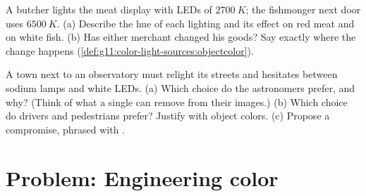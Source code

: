 \begin{exercise}[$\star\star\star$]\label{exo:g11:color-light-sources:14}
A butcher lights the meat display with LEDs of 
$\qty{2700}{K}$; the fishmonger next door uses $\qty{6500}{K}$.
(a) Describe the hue of each lighting and its effect on red meat and on
white fish. (b) Has either merchant changed his goods? Say exactly
where the change happens (\cref{def:g11:color-light-sources:objectcolor}).
\end{exercise}

\begin{exercise}[$\star\star\star$]\label{exo:g11:color-light-sources:15}
A town next to an observatory must relight its streets and hesitates
between  sodium lamps and  white LEDs.
(a) Which choice do the astronomers prefer, and why? (Think of what a
single  can remove from their images.) (b) Which choice do
drivers and pedestrians prefer? Justify with object colors.
(c) Propose a compromise, phrased with .
\end{exercise}

\section{Problem: Engineering color}

